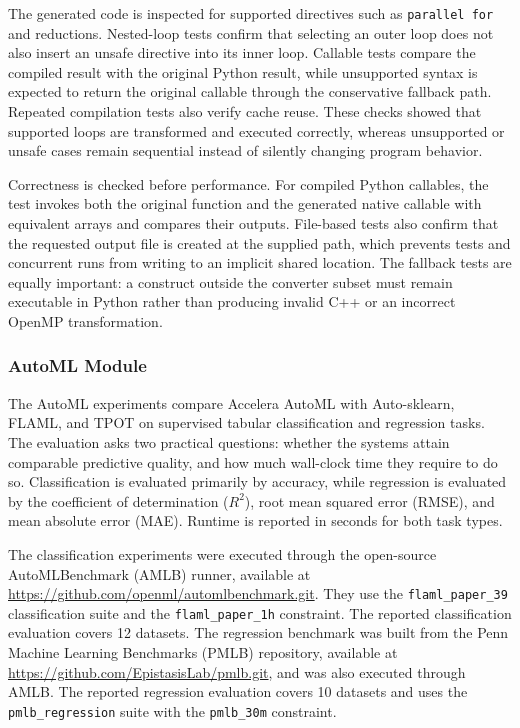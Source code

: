 \documentclass[12pt,a4paper]{report}
\newcommand{\modulepath}[1]{\texttt{#1}}
\begin{document}
\noindent The generated code is inspected for supported directives such as
\texttt{parallel for} and reductions. Nested-loop tests confirm that selecting
an outer loop does not also insert an unsafe directive into its inner loop.
Callable tests compare the compiled result with the original Python result,
while unsupported syntax is expected to return the original callable through
the conservative fallback path. Repeated compilation tests also verify cache
reuse. These checks showed that supported loops are transformed and executed
correctly, whereas unsupported or unsafe cases remain sequential instead of
silently changing program behavior.

\noindent Correctness is checked before performance. For compiled Python
callables, the test invokes both the original function and the generated native
callable with equivalent arrays and compares their outputs. File-based tests
also confirm that the requested output file is created at the supplied path,
which prevents tests and concurrent runs from writing to an implicit shared
location. The fallback tests are equally important: a construct outside the
converter subset must remain executable in Python rather than producing invalid
C++ or an incorrect OpenMP transformation.

\subsubsection{AutoML Module}

The AutoML experiments compare Accelera AutoML with Auto-sklearn, FLAML, and
TPOT on supervised tabular classification and regression tasks. The evaluation
asks two practical questions: whether the systems attain comparable predictive
quality, and how much wall-clock time they require to do so. Classification is
evaluated primarily by accuracy, while regression is evaluated by the
coefficient of determination ($R^2$), root mean squared error (RMSE), and mean
absolute error (MAE). Runtime is reported in seconds for both task types.

The classification experiments were executed through the open-source
AutoMLBenchmark (AMLB) runner, available at
\url{https://github.com/openml/automlbenchmark.git}. They use the
\modulepath{flaml\_paper\_39} classification suite and the
\modulepath{flaml\_paper\_1h} constraint. The reported classification
evaluation covers 12 datasets. The regression benchmark was built from the
Penn Machine Learning Benchmarks (PMLB) repository, available at
\url{https://github.com/EpistasisLab/pmlb.git}, and was also executed through
AMLB. The reported regression evaluation covers 10 datasets and uses the
\modulepath{pmlb\_regression} suite with the \modulepath{pmlb\_30m}
constraint.
\end{document}
